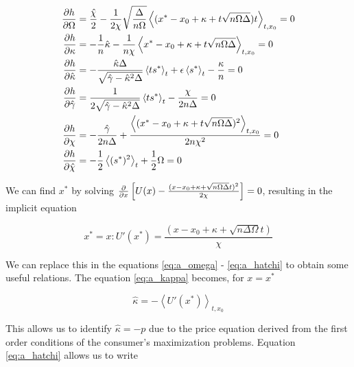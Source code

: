 \begin{align}
  \frac{\partial h}{\partial \Omega} & = \frac{\hat{\chi}}{2} -
  \frac{1}{2\chi} \sqrt{\frac{\Delta}{n\Omega}}\left\langle (x^* - x_0
  + \kappa + t \sqrt{n\Omega\Delta})t\right \rangle_{t,x_0} = 0   \label{eq:a_omega}\\
  \frac{\partial h}{\partial \kappa} & = -\frac{1}{n}\hat{\kappa} -
  \frac{1}{n\chi}\left\langle x^* - x_0 + \kappa +
    t\sqrt{n\Omega\Delta} \right \rangle_{t,x_0} = 0  \label{eq:a_kappa} \\
  \frac{\partial h}{\partial \hat{\kappa}} & = -\frac{\hat{\kappa}\Delta}{\sqrt{\hat{\gamma} - 
      \hat{\kappa}^2\Delta}} \left\langle t s^*\right\rangle_t + \epsilon
  \left\langle s^*\right\rangle_t - \frac{\kappa}{n} = 0 \label{eq:a_hatkappa}\\
  \frac{\partial h}{\partial \hat{\gamma}} & = \frac{1}{2\sqrt{\hat{\gamma} - 
      \hat{\kappa}^2 \Delta}} \left\langle t s^*\right\rangle_t -
  \frac{\chi}{2n\Delta} = 0\label{eq:a_gamma}\\
  \frac{\partial h}{\partial \chi} & = - \frac{\hat{\gamma}}{2n\Delta} + \frac{\left\langle (x^* - x_0 + \kappa +
    t\sqrt{n\Omega\Delta})^2 \right \rangle_{t,x_0}}{2n\chi^2} = 0\label{eq:a_chi}\\
  \frac{\partial h}{\partial \hat{\chi}} & = -\frac{1}{2} \left\langle (s^*)^2
  \right\rangle_t + \frac{1}{2} \Omega = 0\label{eq:a_hatchi}
\end{align}

We can find $x^\ast$ by solving $\frac{\partial}{\partial x} \left[U(x) - \frac{(x - x_0 + \kappa + \sqrt{n\Omega\Delta}t)^2}{2\chi}\right] = 0$, resulting in the implicit equation

\begin{equation}
  \label{eq:a_55}
  x^* = x : U'(x^*) = \frac{(x - x_0 + \kappa +
      \sqrt{n\Delta\Omega}t)}{\chi}
\end{equation}

We can replace this in the equations \eqref{eq:a_omega} - \eqref{eq:a_hatchi} to obtain some useful relations. The equation \eqref{eq:a_kappa} becomes, for $x = x^*$

\begin{equation}
  \label{eq:a_56}
  \hat{\kappa} = -\left \langle U'(x^*) \right \rangle_{t,x_0}
\end{equation}

This allows us to identify $\hat{\kappa} = -p$ due to the price equation derived from the first order conditions of the consumer's maximization problems. Equation \eqref{eq:a_hatchi} allows us to write

